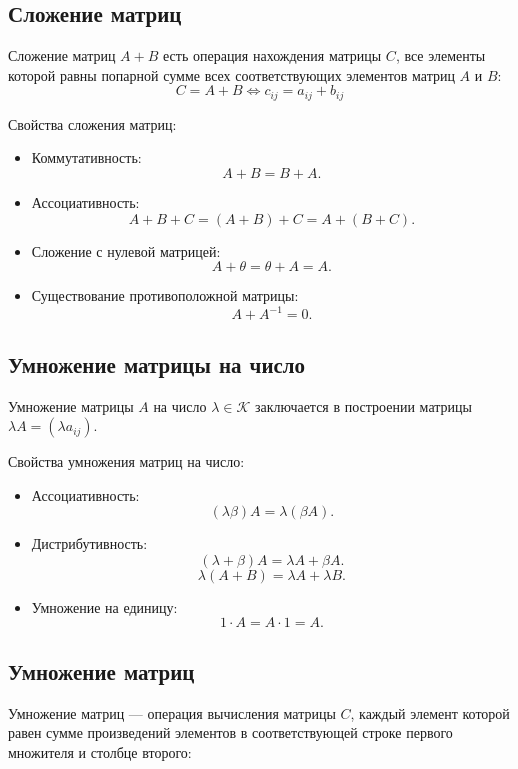 \documentclass[a5paper, 11pt]{extbook}
\theoremstyle{definition}
\theoremstyle{definition}
\begin{document}
\subsection{Сложение матриц}
\label{sec:org930f363}
Сложение матриц \(A + B\) есть операция нахождения матрицы \(C\), все элементы которой равны попарной сумме всех соответствующих элементов матриц \(A\) и \(B\):
\begin{equation*}
    C = A + B \iff c_{ij} = a_{ij} + b_{ij}
\end{equation*}

Свойства сложения матриц:
\begin{itemize}
    \item Коммутативность:
          \[
              A + B = B + A.
          \]
    \item Ассоциативность:
          \[
              A + B + C = (A + B) + C = A + (B + C).
          \]
    \item Сложение с нулевой матрицей:
          \[
              A + \theta = \theta + A = A.
          \]
    \item Существование противоположной матрицы:
          \[
              A + A^{-1} = 0.
          \]
\end{itemize}

\subsection{Умножение матрицы на число}
\label{sec:org006ca40}
Умножение матрицы \(A\) на число \(\lambda \in \mathcal{K}\) заключается в построении матрицы \(\lambda A = (\lambda a_{ij})\).

Свойства умножения матриц на число:
\begin{itemize}
    \item Ассоциативность:
          \[
              (\lambda \beta) A = \lambda (\beta A).
          \]
    \item Дистрибутивность:
          \[
              (\lambda + \beta) A = \lambda A + \beta A.
          \]
          \[
              \lambda (A + B) = \lambda A + \lambda B.
          \]
    \item Умножение на единицу:
          \[
              1 \cdot A = A \cdot 1 = A.
          \]
\end{itemize}

\subsection{Умножение матриц}
\label{sec:org3cd53f8}
Умножение матриц — операция вычисления матрицы \(C\), каждый элемент которой равен сумме произведений элементов в соответствующей строке первого множителя и столбце второго:
\end{document}
